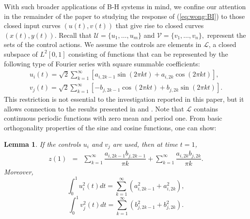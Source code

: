 \documentclass[12pt,onecolumn,draftcls]{IEEEtran}
\newcommand{\cU}{\mathcal{U}}
\newcommand{\cV}{\mathcal{V}}
\newtheorem{lemma}{Lemma}[section]
\begin{document}
With such broader applications of B-H systems in mind, we confine our attention in the remainder of the paper to studying the response of (\ref{eq:wong:BI}) to those closed input curves $(u(t),v(t))$ that give rise to closed curves $(x(t),y(t))$.  Recall that $\cU=\{ u_1,\ldots, u_m \}$ and $\cV=\{ v_1,\ldots, v_n \},$
represent the sets of the control actions.  We assume the controls are elements in $\mathcal{L}$, a closed subspace of $L^2[0,1]$ consisting of functions that can be represented by the following type
of Fourier series with square summable coefficients: 
\begin{equation}
\begin{array}{lll}
u_i(t)= \sqrt{2} \sum_{k=1}^\infty \left[a_{i,2k-1}  \sin(2\pi kt) +  a_{i,2k}  \cos(2\pi kt) \right], \\
v_j(t)= \sqrt{2} \sum_{k=1}^\infty \left[ -b_{j,2k-1}  \cos(2\pi kt) + b_{j,2k}  \sin(2\pi kt) \right].
\end{array}
\label{eq:Fourier}
\end{equation}
This restriction is not essential to the investigation reported in this paper, but it
allows connection to the results presented in \cite{WB} and \cite{CDC09}.
Note that $\mathcal{L}$ contains continuous periodic functions with zero mean and period one.
From basic orthogonality properties of the sine and cosine functions, one can show:
\begin{lemma}
\label{lemma:1}
If the controls $u_i$ and $v_j$ are used, then at time $t=1$,
\begin{equation}
\begin{array}{lll}
z(1)&=&  \sum_{k=1}^\infty \dfrac{a_{i,2k-1}b_{j,2k-1}}{\pi k} + \sum_{k=1}^\infty \dfrac{a_{i,2k}b_{j,2k}}{\pi k} .
\end{array}
\end{equation}
Moreover,
\begin{equation}
\int_0^1 u_i^2(t)dt =  \sum_{k=1}^\infty (a_{i,2k-1}^2+a_{i,2k}^2),
\end{equation}
\begin{equation}
\int_0^1 v_j^2(t)dt =  \sum_{k=1}^\infty (b_{j,2k-1}^2+b_{j,2k}^2).
\end{equation}
\end{lemma}
\end{document}
